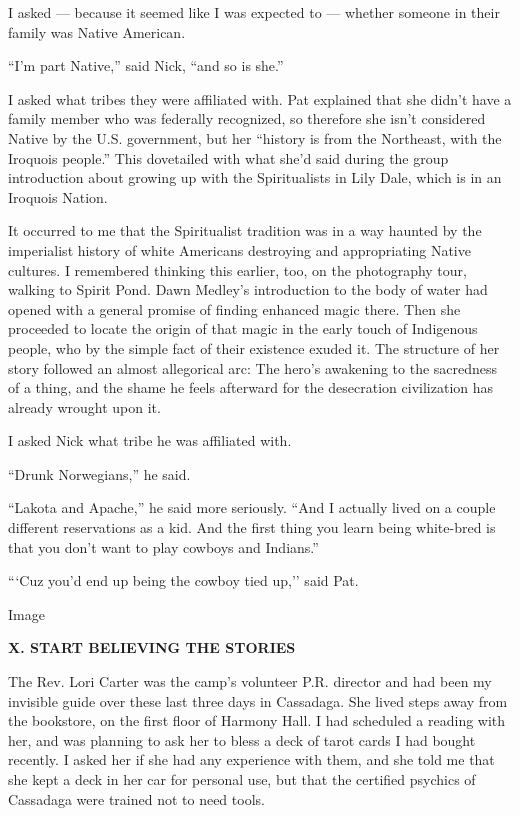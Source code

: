 I asked --- because it seemed like I was expected to --- whether someone
in their family was Native American.

``I'm part Native,'' said Nick, ``and so is she.''

I asked what tribes they were affiliated with. Pat explained that she
didn't have a family member who was federally recognized, so therefore
she isn't considered Native by the U.S. government, but her ``history is
from the Northeast, with the Iroquois people.'' This dovetailed with
what she'd said during the group introduction about growing up with the
Spiritualists in Lily Dale, which is in an Iroquois Nation.

It occurred to me that the Spiritualist tradition was in a way haunted
by the imperialist history of white Americans destroying and
appropriating Native cultures. I remembered thinking this earlier, too,
on the photography tour, walking to Spirit Pond. Dawn Medley's
introduction to the body of water had opened with a general promise of
finding enhanced magic there. Then she proceeded to locate the origin of
that magic in the early touch of Indigenous people, who by the simple
fact of their existence exuded it. The structure of her story followed
an almost allegorical arc: The hero's awakening to the sacredness of a
thing, and the shame he feels afterward for the desecration civilization
has already wrought upon it.

I asked Nick what tribe he was affiliated with.

``Drunk Norwegians,'' he said.

``Lakota and Apache,'' he said more seriously. ``And I actually lived on
a couple different reservations as a kid. And the first thing you learn
being white-bred is that you don't want to play cowboys and Indians.''

```Cuz you'd end up being the cowboy tied up,'' said Pat.

Image

\textbf{X. START BELIEVING THE STORIES}

The Rev. Lori Carter was the camp's volunteer P.R. director and had been
my invisible guide over these last three days in Cassadaga. She lived
steps away from the bookstore, on the first floor of Harmony Hall. I had
scheduled a reading with her, and was planning to ask her to bless a
deck of tarot cards I had bought recently. I asked her if she had any
experience with them, and she told me that she kept a deck in her car
for personal use, but that the certified psychics of Cassadaga were
trained not to need tools.

